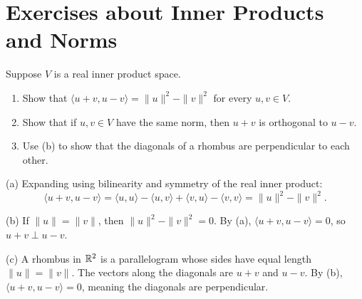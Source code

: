 \section*{Exercises about Inner Products and Norms}

\begin{xrcs}
  Suppose $V$ is a real inner product space.
  \begin{enumerate}[label=\textbf{(\alph*)}]
    \item Show that $\langle u+v, u-v \rangle = \|u\|^2 - \|v\|^2$ for every $u, v \in V$.
    \item Show that if $u, v \in V$ have the same norm, then $u+v$ is orthogonal to $u-v$.
    \item Use (b) to show that the diagonals of a rhombus are perpendicular to each other.
  \end{enumerate}

\begin{xprf}
  \StepOne (a) Expanding using bilinearity and symmetry of the real inner product:
  \[
    \langle u+v, u-v \rangle = \langle u, u \rangle - \langle u, v \rangle + \langle v, u \rangle - \langle v, v \rangle = \|u\|^2 - \|v\|^2.
  \]

  \StepTwo (b) If $\|u\| = \|v\|$, then $\|u\|^2 - \|v\|^2 = 0$. By (a), $\langle u+v, u-v \rangle = 0$, so $u+v \perp u-v$.

  \StepThree (c) A rhombus in $\mathbb{R}^2$ is a parallelogram whose sides have equal length $\|u\| = \|v\|$. The vectors along the diagonals are $u+v$ and $u-v$. By (b), $\langle u+v, u-v \rangle = 0$, meaning the diagonals are perpendicular.
\end{xprf}
\end{xrcs}

